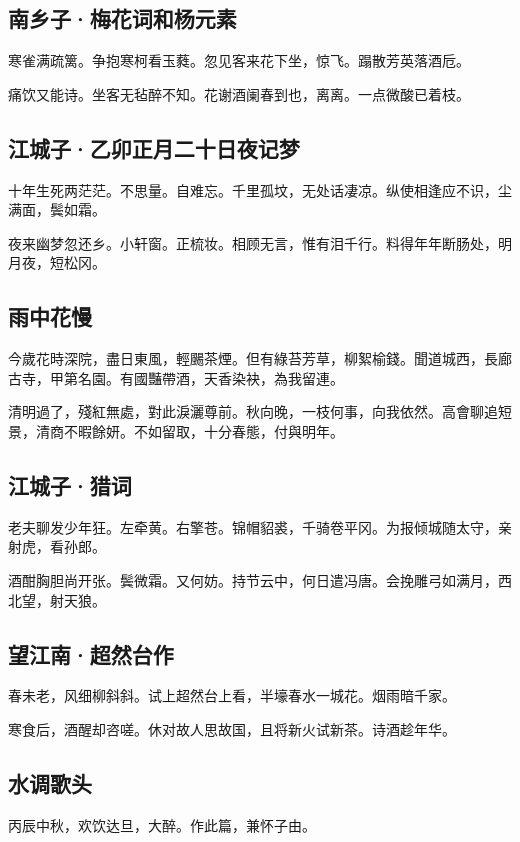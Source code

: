 \documentclass[a5paper]{ctexart}
\begin{document}
	\subsection{南乡子·梅花词和杨元素}
	寒雀满疏篱。争抱寒柯看玉蕤。忽见客来花下坐，惊飞。蹋散芳英落酒卮。
	
	痛饮又能诗。坐客无毡醉不知。花谢酒阑春到也，离离。一点微酸已着枝。
	
	\subsection{江城子·乙卯正月二十日夜记梦}
	十年生死两茫茫。不思量。自难忘。千里孤坟，无处话凄凉。纵使相逢应不识，尘满面，鬓如霜。　
	
	夜来幽梦忽还乡。小轩窗。正梳妆。相顾无言，惟有泪千行。料得年年断肠处，明月夜，短松冈。　
	
	\subsection{雨中花慢}
	今歲花時深院，盡日東風，輕颺茶煙。但有綠苔芳草，柳絮榆錢。聞道城西，長廊古寺，甲第名園。有國豔帶酒，天香染袂，為我留連。
	
	清明過了，殘紅無處，對此淚灑尊前。秋向晚，一枝何事，向我依然。高會聊追短景，清商不暇餘妍。不如留取，十分春態，付與明年。
	
	\subsection{江城子·猎词}
	老夫聊发少年狂。左牵黄。右擎苍。锦帽貂裘，千骑卷平冈。为报倾城随太守，亲射虎，看孙郎。
	
	酒酣胸胆尚开张。鬓微霜。又何妨。持节云中，何日遣冯唐。会挽雕弓如满月，西北望，射天狼。　
	
	\subsection{望江南·超然台作}
	春未老，风细柳斜斜。试上超然台上看，半壕春水一城花。烟雨暗千家。
	
	寒食后，酒醒却咨嗟。休对故人思故国，且将新火试新茶。诗酒趁年华。
	
	\subsection{水调歌头}
	\begin{small}
		丙辰中秋，欢饮达旦，大醉。作此篇，兼怀子由。
	\end{small}
	
\end{document}
